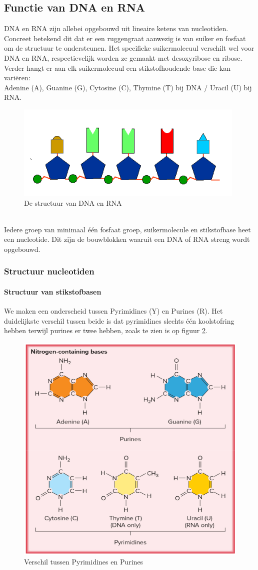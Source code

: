 \documentclass[a4paper,kul]{kulakarticle} %
\begin{document}
\subsection{Functie van DNA en RNA}
DNA en RNA zijn allebei opgebouwd uit lineaire ketens van nucleotiden. Concreet betekend dit dat er een ruggengraat aanwezig is van suiker en fosfaat om de structuur te ondersteunen. Het specifieke suikermolecuul verschilt wel voor DNA en RNA, respectievelijk worden ze gemaakt met desoxyribose en ribose. Verder hangt er aan elk suikermolecuul een stikstofhoudende base die kan variëren: \\Adenine (A), Guanine (G), Cytosine (C), Thymine (T) bij DNA / Uracil (U) bij RNA.
\begin{figure}[h]
	\centering
	\includegraphics[width=0.7\linewidth]{DNAStructuur}
	\caption[DNA Structuur]{De structuur van DNA en RNA}
	\label{fig:dnastructuur}
\end{figure}\\
Iedere groep van minimaal één fosfaat groep, suikermolecule en stikstofbase heet een nucleotide. Dit zijn de bouwblokken waaruit een DNA of RNA streng wordt opgebouwd. 
\subsubsection{Structuur nucleotiden}
\paragraph{Structuur van stikstofbasen}
We maken een onderscheid tussen Pyrimidines (Y) en Purines (R). Het duidelijkste verschil tussen beide is dat pyrimidines slechts één koolstofring hebben terwijl purines er twee hebben, zoals te zien is op figuur \ref{fig:structuurstikstofbase}.
\begin{figure}[h]
	\centering
	\includegraphics[width=0.5\linewidth]{StructuurStikstofBase}
	\caption[StructuurStikstofBase]{Verschil tussen Pyrimidines en Purines}
	\label{fig:structuurstikstofbase}
\end{figure}\\
\end{document}
